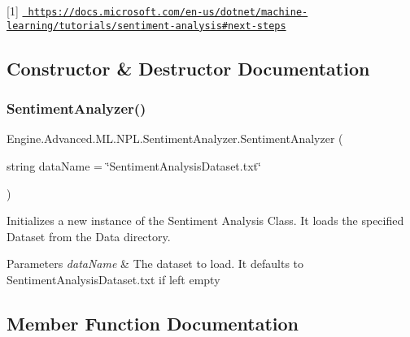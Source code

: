 \mbox{[}1\mbox{]} \href{https://docs.microsoft.com/en-us/dotnet/machine-learning/tutorials/sentiment-analysis\#next-steps}{\texttt{ https\+://docs.\+microsoft.\+com/en-\/us/dotnet/machine-\/learning/tutorials/sentiment-\/analysis\#next-\/steps}} 

\subsection{Constructor \& Destructor Documentation}
\mbox{\label{class_engine_1_1_advanced_1_1_m_l_1_1_n_p_l_1_1_sentiment_analyzer_a138741ac30d164a8131fac6ed94e35d7}} 
\subsubsection{\texorpdfstring{SentimentAnalyzer()}{SentimentAnalyzer()}}
{\footnotesize\ttfamily Engine.\+Advanced.\+M\+L.\+N\+P\+L.\+Sentiment\+Analyzer.\+Sentiment\+Analyzer (\begin{DoxyParamCaption}\item[{string}]{data\+Name = {\ttfamily \char`\"{}SentimentAnalysisDataset.txt\char`\"{}} }\end{DoxyParamCaption})}



Initializes a new instance of the Sentiment Analysis Class. It loads the specified Dataset from the Data directory. 


\begin{DoxyParams}{Parameters}
{\em data\+Name} & The dataset to load. It defaults to Sentiment\+Analysis\+Dataset.\+txt if left empty\\
\hline
\end{DoxyParams}


\subsection{Member Function Documentation}
\mbox{\label{class_engine_1_1_advanced_1_1_m_l_1_1_n_p_l_1_1_sentiment_analyzer_aea5355c7816f5e9a834ed78e5302a67e}} 
